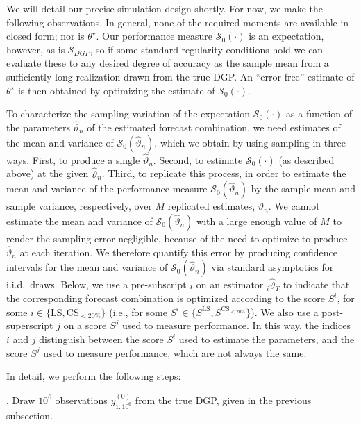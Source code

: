 \documentclass[12pt]{article}
\theoremstyle{definition}
\theoremstyle{remark}
\begin{document}
We will detail our precise simulation design shortly. For now, we make the following observations. In general, none of the required moments are available in closed form; nor is $\theta ^{\star }$. Our performance measure  $\mathcal{S}_{0}(\cdot)$ is an expectation, however, as is $\mathcal{S}_{DGP}$, so if some standard regularity conditions hold we can evaluate these to any desired degree of accuracy as the sample mean from a sufficiently long realization drawn from the true DGP. An ``error-free'' estimate of $\theta ^{\star }$ is then obtained by optimizing the estimate of $\mathcal{S}_{0}(\cdot)$.

To characterize the sampling variation of the expectation $\mathcal{S}_0(\cdot)$ as a function of the parameters $\hat{\vartheta}_n$ of the estimated forecast combination, we need estimates of the mean and variance of $\mathcal{S}_0(\hat{\vartheta}_n)$, which we obtain by using sampling in three ways. First, to produce a single $\hat{\vartheta}_n$. Second, to estimate $\mathcal{S}_0(\cdot)$ (as described above) at the given $\hat{\vartheta}_n$. Third, to replicate this process, in order to estimate the mean and variance of the performance measure $\mathcal{S}_0(\hat{\vartheta}_n)$ by the sample mean and sample variance, respectively, over $M$ replicated estimates, $\hat{\vartheta}_n$. We cannot estimate the mean and variance of $\mathcal{S}_0(\hat{\vartheta}_n)$ with a large enough value of $M$ to render the sampling error negligible, because of the need to optimize to produce $\hat{\vartheta}_n$ at each iteration. We therefore quantify this error by producing confidence intervals for the mean and variance of $\mathcal{S}_0(\hat{\vartheta}_n)$ via standard asymptotics for i.i.d.\ draws. Below, we use a pre-subscript $i$ on an estimator ${}_i \hat{\vartheta}_T$ to indicate that the corresponding forecast combination is optimized according to the score $S^i$, for some $i \in \{\mathrm{LS}, \mathrm{CS}_{<20\%}\}$ (i.e., for some $S^i \in \{S^{\mathrm{LS}}, S^{\mathrm{CS}_{<20\%}}\}$). We also use a post-superscript $j$ on a score $S^j$ used to measure performance. In this way, the indices $i$ and $j$ distinguish between the score $S^i$ used to estimate the parameters, and the score $S^j$ used to measure performance, which are not always the same.

In detail, we perform the following steps:

\medskip

. Draw $10^6$ observations $y^{(0)}_{1:10^6}$ from the true DGP, given in the previous subsection.
\end{document}
